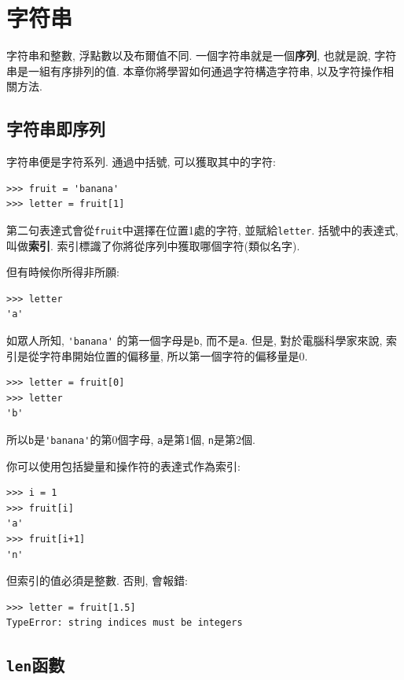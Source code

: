 \documentclass[10pt]{book}
\begin{document}
\chapter{字符串}
\label{strings}

字符串和整數, 浮點數以及布爾值不同. 
一個字符串就是一個{\bf 序列}, 也就是說, 字符串是一組有序排列的值. 
本章你將學習如何通過字符構造字符串, 以及字符操作相關方法. 


\section{字符串即序列}

字符串便是字符系列. 
通過中括號, 可以獲取其中的字符:

\begin{verbatim}
>>> fruit = 'banana'
>>> letter = fruit[1]
\end{verbatim}
%
第二句表達式會從{\tt fruit}中選擇在位置1處的字符, 並賦給{\tt letter}. 
括號中的表達式, 叫做{\bf 索引}.
索引標識了你將從序列中獲取哪個字符(類似名字).

但有時候你所得非所願:

\begin{verbatim}
>>> letter
'a'
\end{verbatim}
%
如眾人所知,  \verb"'banana'" 的第一個字母是{\tt b}, 
而不是{\tt a}. 但是, 對於電腦科學家來說, 索引是從字符串開始位置的偏移量, 
所以第一個字符的偏移量是0.

\begin{verbatim}
>>> letter = fruit[0]
>>> letter
'b'
\end{verbatim}
%
所以{\tt b}是\verb"'banana'"的第0個字母,  {\tt a}是第1個, {\tt n}是第2個. 
 

你可以使用包括變量和操作符的表達式作為索引:

\begin{verbatim}
>>> i = 1
>>> fruit[i]
'a'
>>> fruit[i+1]
'n'
\end{verbatim}
%
但索引的值必須是整數. 否則, 會報錯:

\begin{verbatim}
>>> letter = fruit[1.5]
TypeError: string indices must be integers
\end{verbatim}
%

\section{{\tt len}函數}
\end{document}
